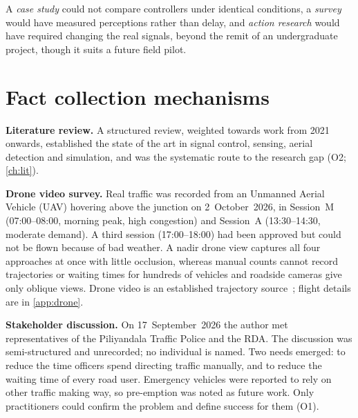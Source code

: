 A \emph{case study} could not compare controllers under identical conditions, a \emph{survey} would have measured perceptions rather than delay, and \emph{action research} would have required changing the real signals, beyond the remit of an undergraduate project, though it suits a future field pilot.

\section{Fact collection mechanisms}\label{sec:method-facts}

\textbf{Literature review.} A structured review, weighted towards work from 2021 onwards, established the state of the art in signal control, sensing, aerial detection and simulation, and was the systematic route to the research gap (O2; \cref{ch:lit}).

\textbf{Drone video survey.} Real traffic was recorded from an Unmanned Aerial Vehicle (UAV) hovering above the junction on 2~October~2026, in Session~M (07:00--08:00, morning peak, high congestion) and Session~A (13:30--14:30, moderate demand). A third session (17:00--18:00) had been approved but could not be flown because of bad weather. A nadir drone view captures all four approaches at once with little occlusion, whereas manual counts cannot record trajectories or waiting times for hundreds of vehicles and roadside cameras give only oblique views. Drone video is an established trajectory source~\cite{krajewski2018highd,barmpounakis2020pneuma}; flight details are in \cref{app:drone}.

\textbf{Stakeholder discussion.} On 17~September~2026 the author met representatives of the Piliyandala Traffic Police and the RDA. The discussion was semi-structured and unrecorded; no individual is named. Two needs emerged: to reduce the time officers spend directing traffic manually, and to reduce the waiting time of every road user. Emergency vehicles were reported to rely on other traffic making way, so pre-emption was noted as future work. Only practitioners could confirm the problem and define success for them (O1).

